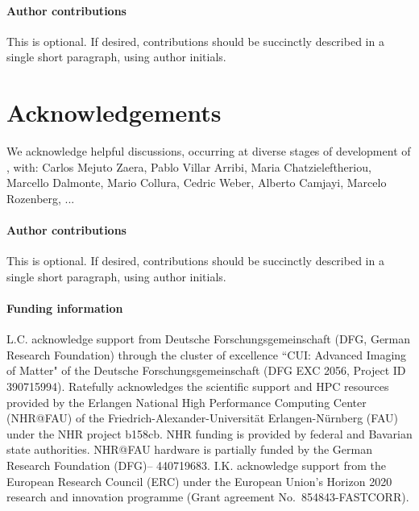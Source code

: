 \documentclass[edipack_sp.tex]{subfiles}
\begin{document}

\paragraph{Author contributions}
This is optional. If desired, contributions should be succinctly described in a single short paragraph, using author initials.


\section*{Acknowledgements}
We acknowledge helpful discussions, occurring at diverse stages of development of \NAME, with: Carlos Mejuto Zaera, Pablo Villar Arribi, Maria Chatzieleftheriou, Marcello Dalmonte, Mario Collura, Cedric Weber, Alberto Camjayi, Marcelo Rozenberg, ...   

\paragraph{Author contributions}
This is optional. If desired, contributions should be succinctly described in a single short paragraph, using author initials.

\paragraph{Funding information}
L.C. acknowledge support from Deutsche Forschungsgemeinschaft (DFG, German Research Foundation) thr\-ough the cluster of excellence ``CUI: Advanced Imaging of Matter" of the Deutsche Forschungsgemeinschaft (DFG EXC 2056, Project ID 390715994). Ratefully acknowledges the scientific support and HPC resources provided by the Erlangen National High Performance Computing Center (NHR@FAU) of the Friedrich-Alexander-Universität Erlangen-Nürnberg (FAU) under the NHR project b158cb. NHR funding is provided by federal and Bavarian state authorities. NHR@FAU hardware is partially funded by the German Research Foundation (DFG)– 440719683.
I.K. acknowledge support from the European Research Council (ERC) under the European Union's Horizon 2020 research and innovation programme (Grant agreement No.~854843-FASTCORR).
\end{document}
